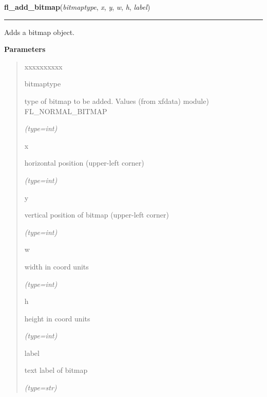     \vspace{0.5ex}

\hspace{.8\funcindent}\begin{boxedminipage}{\funcwidth}

    \raggedright \textbf{fl\_add\_bitmap}(\textit{bitmaptype}, \textit{x}, \textit{y}, \textit{w}, \textit{h}, \textit{label})

    \vspace{-1.5ex}

    \rule{\textwidth}{0.5\fboxrule}
\setlength{\parskip}{2ex}
    Adds a bitmap object.

\setlength{\parskip}{1ex}
      \textbf{Parameters}
      \vspace{-1ex}

      \begin{quote}
        \begin{Ventry}{xxxxxxxxxx}

          \item[bitmaptype]

          type of bitmap to be added. Values (from xfdata) module) 
          FL\_NORMAL\_BITMAP

            {\it (type=int)}

          \item[x]

          horizontal position (upper-left corner)

            {\it (type=int)}

          \item[y]

          vertical position of bitmap (upper-left corner)

            {\it (type=int)}

          \item[w]

          width in coord units

            {\it (type=int)}

          \item[h]

          height in coord units

            {\it (type=int)}

          \item[label]

          text label of bitmap

            {\it (type=str)}

        \end{Ventry}


\end{quote}
\end{boxedminipage}
